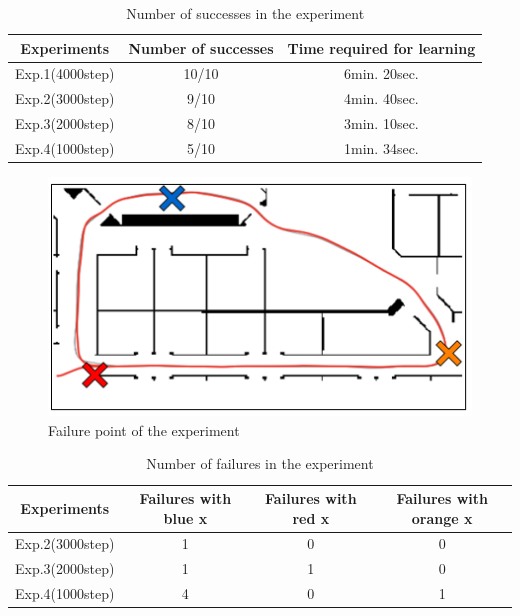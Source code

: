 \vspace{10mm}
\begin{table}[h]
  \centering
  \caption{Number of successes in the experiment}
  \begin{tabular}{|c|c|c|} \hline
    Experiments & Number of successes & Time required for learning\\ \hline
    Exp.1(4000step) & 10/10 & 6min. 20sec.\\ \hline
    Exp.2(3000step) & 9/10 & 4min. 40sec.\\ \hline
    Exp.3(2000step) & 8/10 & 3min. 10sec.\\ \hline
    Exp.4(1000step) & 5/10 & 1min. 34sec.\\ \hline
  \end{tabular}
  \label{tb:exp3}
\end{table}

\begin{figure}[h]
  \centering
  \includegraphics[keepaspectratio, scale=0.5]{images/result4.png}
  \caption{Failure point of the experiment}
  \label{Fig:result3}
  \end{figure}

\begin{table}[h]
  \centering
  \caption{Number of failures in the experiment}
  \begin{tabular}{|c|c|c|c|} \hline
    Experiments & Failures with blue x & Failures with red x & Failures with orange x\\ \hline
    Exp.2(3000step) & 1 & 0 & 0 \\ \hline
    Exp.3(2000step) & 1 & 1 & 0 \\ \hline
    Exp.4(1000step) & 4 & 0 & 1 \\ \hline
  \end{tabular}
  \label{tb:fail3}
\end{table}


